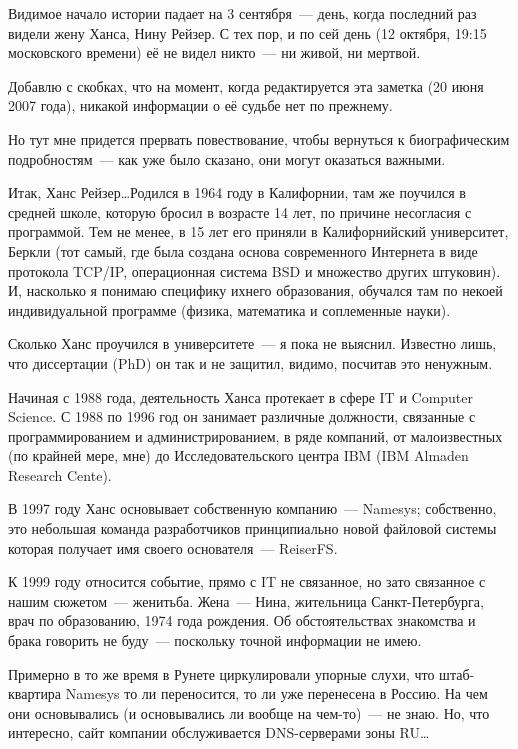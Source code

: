 Видимое начало истории падает на 3 сентября~--- день, когда последний раз видели жену Ханса, Нину Рейзер. С тех пор, и по сей день (12 октября, 19:15 московского времени) её не видел никто~--- ни живой, ни мертвой. 

Добавлю с скобках, что на момент, когда редактируется эта заметка (20 июня 2007 года), никакой информации о её судьбе нет по прежнему. 

Но тут мне придется прервать повествование, чтобы вернуться к биографическим подробностям~--- как уже было сказано, они могут оказаться важными. 

Итак, Ханс Рейзер\dots Родился в 1964 году в Калифорнии, там же поучился в средней школе, которую бросил в возрасте 14 лет, по причине несогласия с программой. Тем не менее, в 15 лет его приняли в Калифорнийский университет, Беркли (тот самый, где была создана основа современного Интернета в виде протокола TCP/IP, операционная система BSD и множество других штуковин). И, насколько я понимаю специфику ихнего образования, обучался там по некоей индивидуальной программе (физика, математика и соплеменные науки). 

Сколько Ханс проучился в университете~--- я пока не выяснил. Известно лишь, что диссертации (PhD) он так и не защитил, видимо, посчитав это ненужным. 

Начиная с 1988 года, деятельность Ханса протекает в сфере IT и Computer Science. С 1988 по 1996 год он занимает различные должности, связанные с программированием и администрированием, в ряде компаний, от малоизвестных (по крайней мере, мне) до Исследовательского центра IBM (IBM Almaden Research Cente). 

В 1997 году Ханс основывает собственную компанию~--- Namesys; собственно, это небольшая команда разработчиков принципиально новой файловой системы которая получает имя своего основателя~--- ReiserFS. 

К 1999 году относится событие, прямо с IT не связанное, но зато связанное с нашим сюжетом~--- женитьба. Жена~--- Нина, жительница Санкт-Петербурга, врач по образованию, 1974 года рождения. Об обстоятельствах знакомства и брака говорить не буду~--- поскольку точной информации не имею. 

Примерно в то же время в Рунете циркулировали упорные слухи, что штаб-квартира Namesys то ли переносится, то ли уже перенесена в Россию. На чем они основывались (и основывались ли вообще на чем-то)~--- не знаю. Но, что интересно, сайт компании обслуживается DNS-серверами зоны RU\dots 

